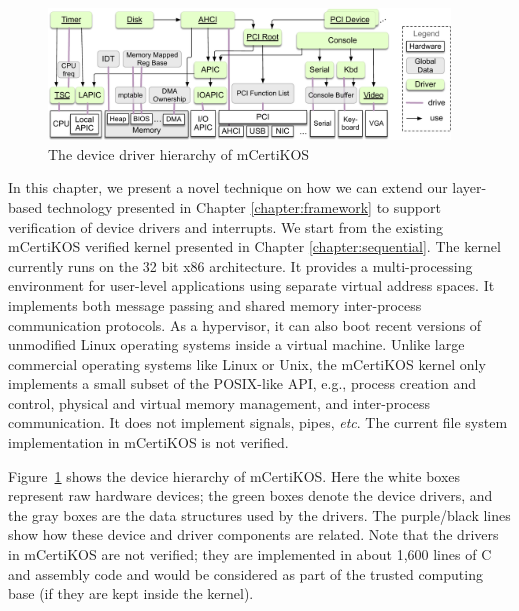 \begin{figure}[t]
\begin{center}
\includegraphics[width=0.95\textwidth]{figs/devices}
\end{center}
\caption{The device driver hierarchy of mCertiKOS}
\label{fig:overview:device}
\end{figure}

In this chapter, we present a novel technique on how we can extend
our layer-based technology presented in Chapter \ref{chapter:framework}
to support verification of device drivers and interrupts.
We start from the existing mCertiKOS verified kernel presented in
Chapter \ref{chapter:sequential}. 
The kernel currently runs on the 32 bit x86 architecture.
It provides a multi-processing environment for user-level applications
using separate virtual address spaces. It implements both message
passing and shared memory inter-process communication protocols. As a
hypervisor, it can also boot recent versions of unmodified Linux
operating systems inside a virtual machine.  Unlike large commercial
operating systems like Linux or Unix, the mCertiKOS kernel only implements
a small subset of the POSIX-like API, e.g., process creation and
control, physical and virtual memory management, and
inter-process communication. It does
not implement signals, pipes, {\it etc}. The current file system
implementation in mCertiKOS is not verified. 

Figure~\ref{fig:overview:device} shows the device hierarchy of mCertiKOS. Here
the white boxes represent raw hardware devices; the green boxes denote the
device drivers, and the gray boxes are the data structures used by the drivers.
The purple/black lines show how these device and driver components are related.
Note that the drivers in mCertiKOS are not verified; they are implemented in
about 1,600 lines of C and assembly code and would be considered as part of the
trusted computing base (if they are kept inside the kernel). 

